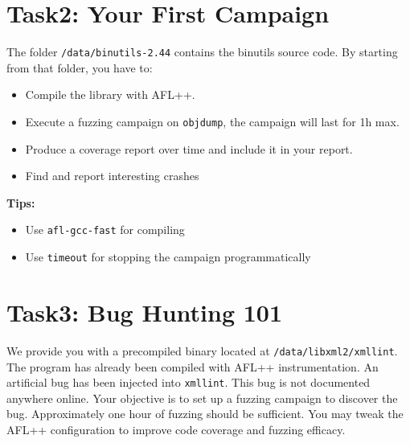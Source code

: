 \documentclass[12pt]{article}
\begin{document}
\section*{Task2: Your First Campaign}

The folder \texttt{/data/binutils-2.44} contains the binutils source code. By
starting from that folder, you have to:

\begin{itemize}
    \item Compile the library with AFL++.
    \item Execute a fuzzing campaign on \texttt{objdump}, the campaign will last
    for 1h max.
    \item Produce a coverage report over time and include it in your report.
    \item Find and report interesting crashes
\end{itemize}

\noindent \textbf{Tips:}
\begin{itemize}
    \item Use \texttt{afl-gcc-fast} for compiling
    \item Use \texttt{timeout} for stopping the campaign programmatically
\end{itemize}

\section*{Task3: Bug Hunting 101}

We provide you with a precompiled binary located at
\texttt{/data/libxml2/xmllint}. The program has already been compiled with AFL++
instrumentation. An artificial bug has been injected into \texttt{xmllint}. This
bug is not documented anywhere online. Your objective is to set up a fuzzing
campaign to discover the bug. Approximately one hour of fuzzing should be
sufficient. You may tweak the AFL++ configuration to improve code coverage and
fuzzing efficacy.


 
\end{document}
